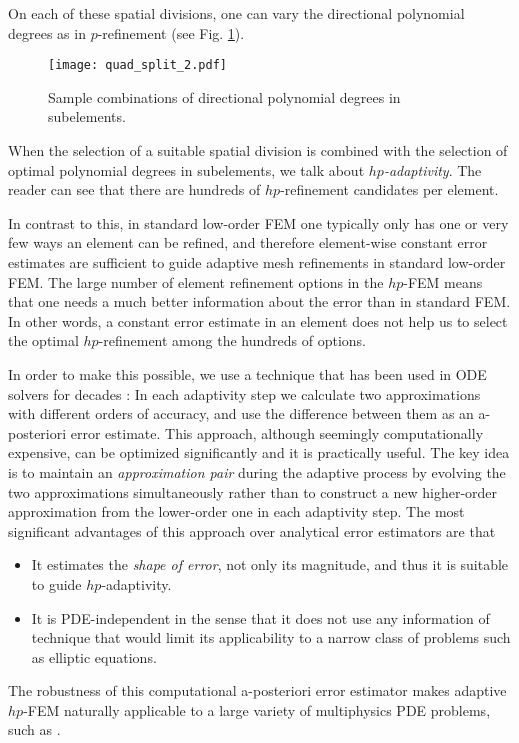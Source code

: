 \documentclass[final,3p,times,twocolumn]{elsarticle}
\begin{document}
On each of these spatial divisions, one can vary the 
directional polynomial degrees as in $p$-refinement
(see Fig. \ref{fig:quadsplit2}). 

\begin{figure}[!htb]
\begin{center}
 {
\texttt{[image: quad\_split\_2.pdf]}
}
\end{center}
\vspace{-5mm}
\caption{Sample combinations of directional polynomial degrees in 
         subelements.}
\label{fig:quadsplit2}
\end{figure}

When the selection of a suitable spatial division is combined 
with the selection of optimal polynomial degrees in 
subelements, we talk about {\em $hp$-adaptivity}. 
The reader can see that there are hundreds of $hp$-refinement 
candidates per element.

In contrast to this, in standard low-order FEM one 
typically only has one or very few ways an element 
can be refined, and therefore element-wise constant 
error estimates are sufficient to guide adaptive 
mesh refinements in standard low-order FEM. 
The large number of element refinement options 
in the $hp$-FEM means that one needs a much better 
information about the error than in standard FEM.
In other words, a constant error estimate in an element
does not help us to select the optimal $hp$-refinement
among the hundreds of options.

In order to make this possible, we use a technique 
that has been used in ODE solvers for decades \cite{hairer}:
In each adaptivity step we calculate two approximations 
with different orders of accuracy, and use the
difference between them as an a-posteriori error 
estimate. This approach, although 
seemingly computationally expensive, can be optimized 
significantly \cite{pdeindep} and it is practically 
useful. The key idea is to maintain an {\em approximation 
pair} during the adaptive process by evolving the two 
approximations simultaneously rather than to construct 
a new higher-order approximation from the lower-order one 
in each adaptivity step. The most significant advantages 
of this approach over analytical error estimators are that

\begin{itemize}
\item It estimates the {\em shape of error}, not only 
      its magnitude, and thus it is suitable to 
      guide $hp$-adaptivity.
\item It is PDE-independent in the sense that it does
      not use any information of technique that would
      limit its applicability to a narrow class of problems
      such as elliptic equations.
\end{itemize} 
The robustness of this computational a-posteriori error 
estimator makes adaptive $hp$-FEM naturally applicable to a large variety 
of multiphysics PDE problems, such as \cite{spacetime-1,spacetime-2}. 
\end{document}
